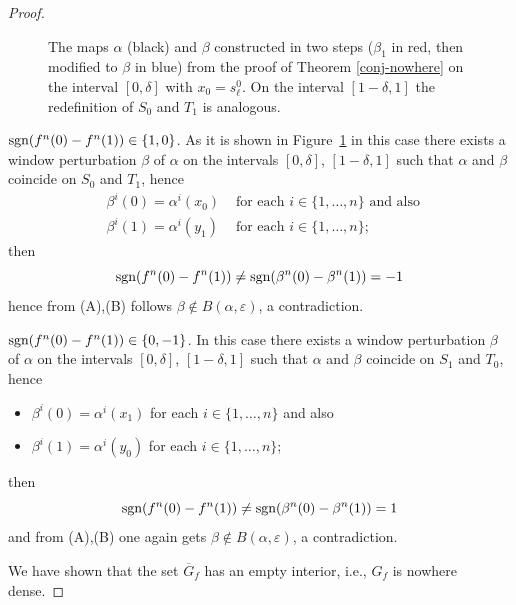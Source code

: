 \documentclass[12pt, a4paper]{amsart}
\def\eps{\varepsilon}
\def\blue{\color{blue}}
\def\sgn{\mbox{\rm sgn} }
\newcommand{\?}{{\bf ???}}
\begin{document}
\begin{proof}
\begin{figure}
	\caption{\label{fig:conjugacyclasses} The maps $\alpha$ (black) and $\beta$ constructed in two steps ($\beta_1$ in red, then modified to $\beta$ in blue) from the proof of Theorem \ref{conj-nowhere} on the interval $[0,\delta]$ with $x_0=s^0_{\ell}$. On the interval $[{1-\delta,1}]$ the redefinition of $S_0$ and $T_1$ is analogous.}
\end{figure} 

 $\sgn(f^n(0)-f^n(1))\in\{1,0\}$. As it is shown in Figure~\ref{fig:conjugacyclasses} in this case there exists a window perturbation $\beta$ of $\alpha$ on the intervals $[0,\delta]$, $[1-\delta,1]$ such that $\alpha$ and $\beta$ coincide on $S_0$ and $T_1$, hence 
\begin{eqnarray*}
    &\beta^i(0)=\alpha^i(x_0)
    & \text{ for each } i\in\{1,\dots,n\} \text{ and also } \\
    &\beta^i(1)=\alpha^i(y_1)
    & \text{ for each } i\in\{1,\dots,n\};
    \end{eqnarray*} 
then $$\sgn(f^n(0)-f^n(1))\neq \sgn(\beta^n(0)-\beta^n(1))=-1$$
hence from (A),(B) follows $\beta\notin B(\alpha,\eps)$, a contradiction.

 $\sgn(f^n(0)-f^n(1))\in\{0,-1\}$. In this case there exists a window perturbation $\beta$ of $\alpha$ on the intervals $[0,\delta]$, $[1-\delta,1]$ such that $\alpha$ and $\beta$ coincide on $S_1$ and $T_0$, hence 
\begin{itemize}
    \item $\beta^i(0)=\alpha^i(x_1)$ for each $i\in\{1,\dots,n\}$ and also 
    \item $\beta^i(1)=\alpha^i(y_0)$ for each $i\in\{1,\dots,n\}$;
    \end{itemize} 
then $$\sgn(f^n(0)-f^n(1))\neq \sgn(\beta^n(0)-\beta^n(1))=1$$
and from (A),(B) one again gets $\beta\notin B(\alpha,\eps)$, a contradiction.

We have shown that the set $\overline{G}_f$ has an empty interior, i.e., $G_f$ is nowhere dense. 
\end{proof}
 
\end{document}
